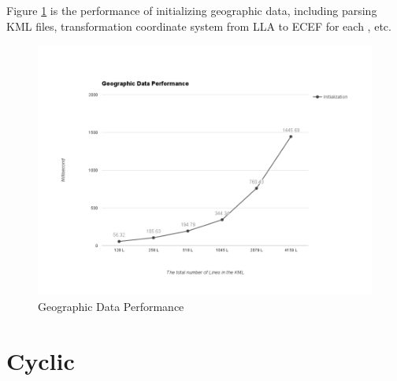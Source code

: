 Figure \ref{fig:geographic-data-performance} is the performance of initializing geographic data, including parsing KML files, transformation coordinate system from LLA to ECEF for each , etc.

\begin{figure}[H]
	\caption{Geographic Data Performance}
	\label{fig:geographic-data-performance}
	\centering
	\includegraphics[width=\textwidth, keepaspectratio]{Figures/geographic-data-performance.png}
	\decoRule
\end{figure}

\section{Cyclic}










